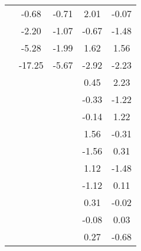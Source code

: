 \begin{table}
\begin{tabular}{c|cc|cc|}
\multicolumn{1}{|c|}{} & \multicolumn{1}{|c|}{     -0.68} & \multicolumn{1}{|c|}{     -0.71} & \multicolumn{1}{|c|}{      2.01} & \multicolumn{1}{|c|}{     -0.07} \\ 
\multicolumn{1}{|c|}{} & \multicolumn{1}{|c|}{     -2.20} & \multicolumn{1}{|c|}{     -1.07} & \multicolumn{1}{|c|}{     -0.67} & \multicolumn{1}{|c|}{     -1.48} \\ 
\multicolumn{1}{|c|}{} & \multicolumn{1}{|c|}{     -5.28} & \multicolumn{1}{|c|}{     -1.99} & \multicolumn{1}{|c|}{      1.62} & \multicolumn{1}{|c|}{      1.56} \\ 
\multicolumn{1}{|c|}{} & \multicolumn{1}{|c|}{    -17.25} & \multicolumn{1}{|c|}{     -5.67} & \multicolumn{1}{|c|}{     -2.92} & \multicolumn{1}{|c|}{     -2.23} \\ 
\multicolumn{1}{|c|}{} & \multicolumn{1}{|c|}{} & \multicolumn{1}{|c|}{} & \multicolumn{1}{|c|}{      0.45} & \multicolumn{1}{|c|}{      2.23} \\ 
\multicolumn{1}{|c|}{} & \multicolumn{1}{|c|}{} & \multicolumn{1}{|c|}{} & \multicolumn{1}{|c|}{     -0.33} & \multicolumn{1}{|c|}{     -1.22} \\ 
\multicolumn{1}{|c|}{} & \multicolumn{1}{|c|}{} & \multicolumn{1}{|c|}{} & \multicolumn{1}{|c|}{     -0.14} & \multicolumn{1}{|c|}{      1.22} \\ 
\multicolumn{1}{|c|}{} & \multicolumn{1}{|c|}{} & \multicolumn{1}{|c|}{} & \multicolumn{1}{|c|}{      1.56} & \multicolumn{1}{|c|}{     -0.31} \\ 
\multicolumn{1}{|c|}{} & \multicolumn{1}{|c|}{} & \multicolumn{1}{|c|}{} & \multicolumn{1}{|c|}{     -1.56} & \multicolumn{1}{|c|}{      0.31} \\ 
\multicolumn{1}{|c|}{} & \multicolumn{1}{|c|}{} & \multicolumn{1}{|c|}{} & \multicolumn{1}{|c|}{      1.12} & \multicolumn{1}{|c|}{     -1.48} \\ 
\multicolumn{1}{|c|}{} & \multicolumn{1}{|c|}{} & \multicolumn{1}{|c|}{} & \multicolumn{1}{|c|}{     -1.12} & \multicolumn{1}{|c|}{      0.11} \\ 
\multicolumn{1}{|c|}{} & \multicolumn{1}{|c|}{} & \multicolumn{1}{|c|}{} & \multicolumn{1}{|c|}{      0.31} & \multicolumn{1}{|c|}{     -0.02} \\ 
\multicolumn{1}{|c|}{} & \multicolumn{1}{|c|}{} & \multicolumn{1}{|c|}{} & \multicolumn{1}{|c|}{     -0.08} & \multicolumn{1}{|c|}{      0.03} \\ 
\multicolumn{1}{|c|}{} & \multicolumn{1}{|c|}{} & \multicolumn{1}{|c|}{} & \multicolumn{1}{|c|}{      0.27} & \multicolumn{1}{|c|}{     -0.68} \\ 

\end{tabular}
\end{table}
